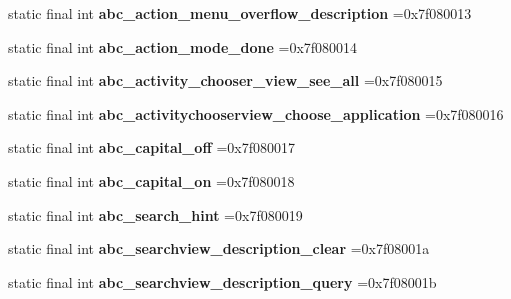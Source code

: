 \begin{DoxyCompactItemize}
static final int {\bfseries abc\+\_\+action\+\_\+menu\+\_\+overflow\+\_\+description} =0x7f080013
\item 
\mbox{\label{classproject4_1_1xaria_1_1R_1_1string_abbed7d810684202c257598861a791e11}} 
static final int {\bfseries abc\+\_\+action\+\_\+mode\+\_\+done} =0x7f080014
\item 
\mbox{\label{classproject4_1_1xaria_1_1R_1_1string_ab6dc05b7bd1954d98d96ab25e97016fd}} 
static final int {\bfseries abc\+\_\+activity\+\_\+chooser\+\_\+view\+\_\+see\+\_\+all} =0x7f080015
\item 
\mbox{\label{classproject4_1_1xaria_1_1R_1_1string_af7d8fa3be853bf9c77b1f2ebf02d9ee4}} 
static final int {\bfseries abc\+\_\+activitychooserview\+\_\+choose\+\_\+application} =0x7f080016
\item 
\mbox{\label{classproject4_1_1xaria_1_1R_1_1string_a0bd145096ecc05a6f532818090bd9d19}} 
static final int {\bfseries abc\+\_\+capital\+\_\+off} =0x7f080017
\item 
\mbox{\label{classproject4_1_1xaria_1_1R_1_1string_a1b9f41a2b074d0f612e5409e34285676}} 
static final int {\bfseries abc\+\_\+capital\+\_\+on} =0x7f080018
\item 
\mbox{\label{classproject4_1_1xaria_1_1R_1_1string_a300babfe97e83c6f46f30e0a085f33c9}} 
static final int {\bfseries abc\+\_\+search\+\_\+hint} =0x7f080019
\item 
\mbox{\label{classproject4_1_1xaria_1_1R_1_1string_a85d4445dae0d826a64a8ec909cdfbd4d}} 
static final int {\bfseries abc\+\_\+searchview\+\_\+description\+\_\+clear} =0x7f08001a
\item 
\mbox{\label{classproject4_1_1xaria_1_1R_1_1string_a4c4d0772e1b7fb6ac2ccccc18bae870c}} 
static final int {\bfseries abc\+\_\+searchview\+\_\+description\+\_\+query} =0x7f08001b
\item 
\mbox{\label{classproject4_1_1xaria_1_1R_1_1string_abd28c545915bf8f16d1bd915ced34532}} 

\end{DoxyCompactItemize}
